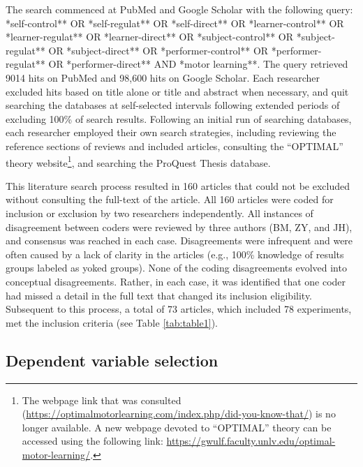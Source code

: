 \documentclass[
  english,
  man, donotrepeattitle,floatsintext]{apa7}
\begin{document}
The search commenced at PubMed and Google Scholar with the following query: *self-control** OR *self-regulat** OR *self-direct** OR *learner-control** OR *learner-regulat** OR *learner-direct** OR *subject-control** OR *subject-regulat** OR *subject-direct** OR *performer-control** OR *performer-regulat** OR *performer-direct** AND *motor learning**. The query retrieved 9014 hits on PubMed and 98,600 hits on Google Scholar. Each researcher excluded hits based on title alone or title and abstract when necessary, and quit searching the databases at self-selected intervals following extended periods of excluding 100\% of search results. Following an initial run of searching databases, each researcher employed their own search strategies, including reviewing the reference sections of reviews and included articles, consulting the ``OPTIMAL'' theory website\footnote{The webpage link that was consulted (\url{https://optimalmotorlearning.com/index.php/did-you-know-that/}) is no longer available. A new webpage devoted to ``OPTIMAL'' theory can be accessed using the following link: \url{https://gwulf.faculty.unlv.edu/optimal-motor-learning/}.}, and searching the ProQuest Thesis database.

This literature search process resulted in 160 articles that could not be excluded without consulting the full-text of the article. All 160 articles were coded for inclusion or exclusion by two researchers independently. All instances of disagreement between coders were reviewed by three authors (BM, ZY, and JH), and consensus was reached in each case. Disagreements were infrequent and were often caused by a lack of clarity in the articles (e.g., 100\% knowledge of results groups labeled as yoked groups). None of the coding disagreements evolved into conceptual disagreements. Rather, in each case, it was identified that one coder had missed a detail in the full text that changed its inclusion eligibility. Subsequent to this process, a total of 73 articles, which included 78 experiments, met the inclusion criteria (see Table \ref{tab:table1}).

\hypertarget{dependent-variable-selection}{%
\subsection{Dependent variable selection}\label{dependent-variable-selection}}
\end{document}
